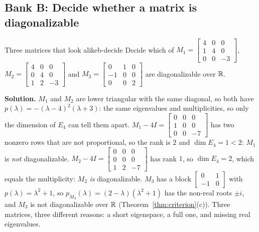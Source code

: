 \documentclass[11pt]{article}
\begin{document}
\subsection*{Bank B: Decide whether a matrix is diagonalizable}
\begin{exmp}{Three matrices that look alike}{b-decide}
Decide which of $M_1=\begin{bmatrix}4&0&0\\1&4&0\\0&0&-3\end{bmatrix}$, $M_2=\begin{bmatrix}4&0&0\\0&4&0\\1&2&-3\end{bmatrix}$ and $M_3=\begin{bmatrix}0&1&0\\-1&0&0\\0&0&2\end{bmatrix}$ are diagonalizable over $\mathbb{R}$.

\textbf{Solution.} $M_1$ and $M_2$ are lower triangular with the same diagonal, so both have $p(\lambda)=-(\lambda-4)^2(\lambda+3)$: the same eigenvalues and multiplicities, so only the dimension of $E_4$ can tell them apart. $M_1-4I=\begin{bmatrix}0&0&0\\1&0&0\\0&0&-7\end{bmatrix}$ has two nonzero rows that are not proportional, so the rank is $2$ and $\dim E_4=1<2$: $M_1$ is \emph{not} diagonalizable. $M_2-4I=\begin{bmatrix}0&0&0\\0&0&0\\1&2&-7\end{bmatrix}$ has rank $1$, so $\dim E_4=2$, which equals the multiplicity: $M_2$ \emph{is} diagonalizable. $M_3$ has a block $\begin{bmatrix}0&1\\-1&0\end{bmatrix}$ with $p(\lambda)=\lambda^2+1$, so $p_{M_3}(\lambda)=(2-\lambda)(\lambda^2+1)$ has the non-real roots $\pm i$, and $M_3$ is not diagonalizable over $\mathbb{R}$ (Theorem~\ref{thm:criterion}(c)). Three matrices, three different reasons: a short eigenspace, a full one, and missing real eigenvalues.
\end{exmp}
\end{document}
